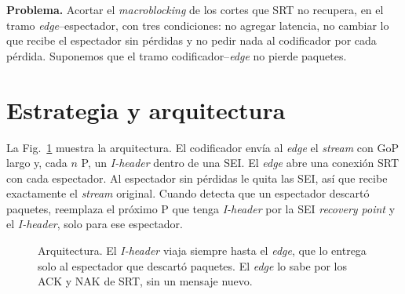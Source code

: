 \documentclass[10pt,twocolumn,letterpaper]{article}
\begin{document}
\textbf{Problema.} Acortar el \emph{macroblocking} de los cortes que SRT no recupera, en el tramo \emph{edge}--espectador, con tres condiciones: no agregar latencia, no cambiar lo que recibe el espectador sin pérdidas y no pedir nada al codificador por cada pérdida. Suponemos que el tramo codificador--\emph{edge} no pierde paquetes.

\section{Estrategia y arquitectura}
\label{sec:metodo}

La Fig.~\ref{fig:arq} muestra la arquitectura. El codificador envía al \emph{edge} el \emph{stream} con GoP largo y, cada $n$ P, un \emph{I-header} dentro de una SEI. El \emph{edge} abre una conexión SRT con cada espectador. Al espectador sin pérdidas le quita las SEI, así que recibe exactamente el \emph{stream} original. Cuando detecta que un espectador descartó paquetes, reemplaza el próximo P que tenga \emph{I-header} por la SEI \emph{recovery point} y el \emph{I-header}, solo para ese espectador.

\begin{figure}[t]
\centering
{}
\caption{Arquitectura. El \emph{I-header} viaja siempre hasta el \emph{edge}, que lo entrega solo al espectador que descartó paquetes. El \emph{edge} lo sabe por los ACK y NAK de SRT, sin un mensaje nuevo.}
\label{fig:arq}
\end{figure}
\end{document}
